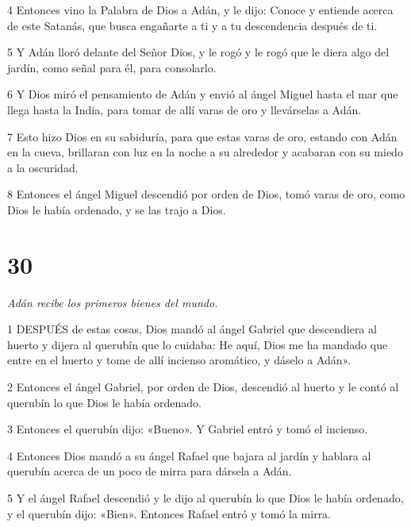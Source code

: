 \par 4 Entonces vino la Palabra de Dios a Adán, y le dijo: Conoce y entiende acerca de este Satanás, que busca engañarte a ti y a tu descendencia después de ti.

\par 5 Y Adán lloró delante del Señor Dios, y le rogó y le rogó que le diera algo del jardín, como señal para él, para consolarlo.

\par 6 Y Dios miró el pensamiento de Adán y envió al ángel Miguel hasta el mar que llega hasta la India, para tomar de allí varas de oro y llevárselas a Adán.

\par 7 Esto hizo Dios en su sabiduría, para que estas varas de oro, estando con Adán en la cueva, brillaran con luz en la noche a su alrededor y acabaran con su miedo a la oscuridad.

\par 8 Entonces el ángel Miguel descendió por orden de Dios, tomó varas de oro, como Dios le había ordenado, y se las trajo a Dios.

\chapter{30}

\par \textit{Adán recibe los primeros bienes del mundo.}

\par 1 DESPUÉS de estas cosas, Dios mandó al ángel Gabriel que descendiera al huerto y dijera al querubín que lo cuidaba: He aquí, Dios me ha mandado que entre en el huerto y tome de allí incienso aromático, y dáselo a Adán».

\par 2 Entonces el ángel Gabriel, por orden de Dios, descendió al huerto y le contó al querubín lo que Dios le había ordenado.

\par 3 Entonces el querubín dijo: «Bueno». Y Gabriel entró y tomó el incienso.

\par 4 Entonces Dios mandó a su ángel Rafael que bajara al jardín y hablara al querubín acerca de un poco de mirra para dársela a Adán.

\par 5 Y el ángel Rafael descendió y le dijo al querubín lo que Dios le había ordenado, y el querubín dijo: «Bien». Entonces Rafael entró y tomó la mirra.

